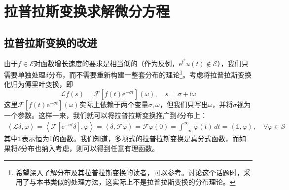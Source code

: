 \section{拉普拉斯变换求解微分方程}\label{sec:Laplace_ODE}

\subsection{拉普拉斯变换的改进}\label{sub:improvement_of_laplace}

由于$f\in\mathcal{E}$对函数增长速度的要求是相当低的（作为反例，$\mathrm{e}^{t^2}u(t)\notin\mathcal{E}$），我们只需要单独处理$\delta$分布，而不需要重新构建一整套分布的理论\footnote{希望深入了解分布及其拉普拉斯变换的读者，可以参考\cite{Laplace_Distribution}。\cite{distribution}讨论这个话题时，采用了与本书类似的处理方法，这实际上不是拉普拉斯变换的分布理论。}。考虑将拉普拉斯变换化归为傅里叶变换，即
\[\mathcal{L} f(s)=\mathcal{F} [f(t)\mathrm{e}^{-\sigma t}](\omega),\quad s=\sigma+\mathrm{i}\omega\]
这里$\mathcal{F} [f(t)\mathrm{e}^{-\sigma t}](\omega)$实际上依赖于两个变量$\sigma,\omega$，但我们只写出$\omega$，并将$\sigma$视为一个参数\cite{distribution}。这样一来，我们就可以将拉普拉斯变换推广到$\delta$分布上：
\begin{align*}
    \left\langle \mathcal{L}\delta,\varphi\right\rangle=\left\langle \mathcal{F} [\mathrm{e}^{-\sigma t}\delta],\varphi\right\rangle=\left\langle \delta,\mathcal{F} \varphi\right\rangle=\mathcal{F}\varphi(0)=\int_{-\infty}^{\infty}\varphi(t)\,dt=\left\langle \mathds{1},\varphi\right\rangle,\quad\forall\varphi\in\mathcal{S}
\end{align*}
其中$\mathds{1}$表示恒为1的函数。我们知道，多项式的拉普拉斯变换是真分式函数，而如果将$\delta$分布也纳入考虑，则可以得到任意有理函数。

